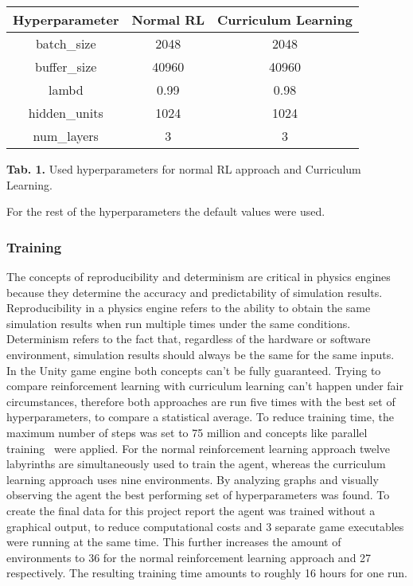\begin{center}
    \begin{tabular}{|c|c|c|}
        \rowcolor{gray!50}
        \hline
        \textbf{Hyperparameter} & \textbf{Normal RL} & \textbf{Curriculum Learning} \\ \hline
        batch\_size    & 2048      & 2048                \\ \hline
        buffer\_size   & 40960     & 40960               \\ \hline
        lambd          & 0.99      & 0.98                \\ \hline
        hidden\_units  & 1024      & 1024                \\ \hline
        num\_layers    & 3         & 3                   \\ \hline
    \end{tabular}
\end{center}
\begin{center}
    \vspace{10pt}
    \textbf{Tab. 1.} Used hyperparameters for normal RL approach and Curriculum Learning.
\end{center}
For the rest of the hyperparameters the default values were used.

\subsubsection{Training}
The concepts of reproducibility and determinism are critical in physics engines because they determine the accuracy and predictability of simulation results.
Reproducibility in a physics engine refers to the ability to obtain the same simulation results when run multiple times under the same conditions.
Determinism refers to the fact that, regardless of the hardware or software environment, simulation results should always be the same for the same inputs.
In the Unity game engine both concepts can't be fully guaranteed.
Trying to compare reinforcement learning with curriculum learning can't happen under fair circumstances, therefore both
approaches are run five times with the best set of hyperparameters, to compare a statistical average.
To reduce training time, the maximum number of steps was set to 75 million and concepts like parallel training~\cite{parallel-training} were applied.
For the normal reinforcement learning approach twelve labyrinths are simultaneously used to train the agent, whereas
the curriculum learning approach uses nine environments.
By analyzing graphs and visually observing the agent the best performing set of hyperparameters was found.
To create the final data for this project report the agent was trained without a graphical output, to reduce computational costs and 3 separate game executables were running at the same time.
This further increases the amount of environments to 36 for the normal reinforcement learning approach and 27 respectively.
The resulting training time amounts to roughly 16 hours for one run.


